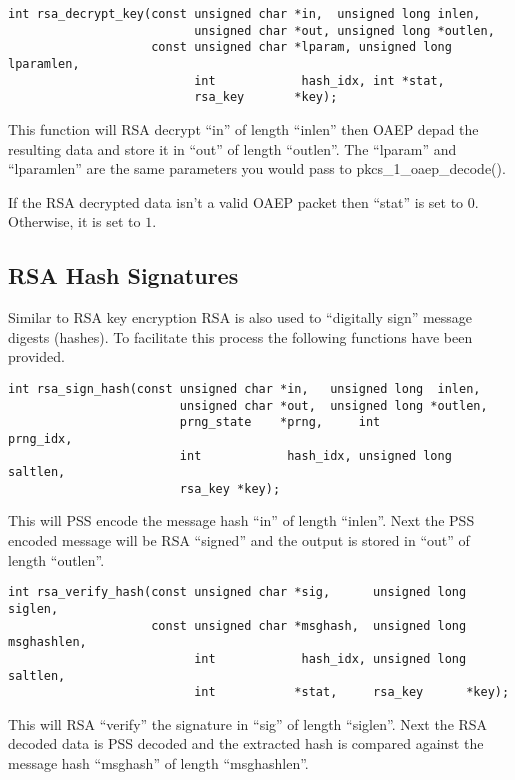\documentclass[a4paper]{book}
\begin{document}
\begin{verbatim}
int rsa_decrypt_key(const unsigned char *in,  unsigned long inlen,
                          unsigned char *out, unsigned long *outlen, 
                    const unsigned char *lparam, unsigned long lparamlen,
                          int            hash_idx, int *stat,
                          rsa_key       *key);
\end{verbatim}
This function will RSA decrypt ``in'' of length ``inlen'' then OAEP depad the resulting data and store it in
``out'' of length ``outlen''.  The ``lparam'' and ``lparamlen'' are the same parameters you would pass
to pkcs\_1\_oaep\_decode().

If the RSA decrypted data isn't a valid OAEP packet then ``stat'' is set to $0$.  Otherwise, it is set to $1$.

\subsection{RSA Hash Signatures}
Similar to RSA key encryption RSA is also used to ``digitally sign'' message digests (hashes).  To facilitate this
process the following functions have been provided.

\begin{verbatim}
int rsa_sign_hash(const unsigned char *in,   unsigned long  inlen, 
                        unsigned char *out,  unsigned long *outlen, 
                        prng_state    *prng,     int            prng_idx,
                        int            hash_idx, unsigned long  saltlen,
                        rsa_key *key);
\end{verbatim}

This will PSS encode the message hash ``in'' of length ``inlen''.  Next the PSS encoded message will be RSA ``signed'' and 
the output is stored in ``out'' of length ``outlen''.  


\begin{verbatim}
int rsa_verify_hash(const unsigned char *sig,      unsigned long siglen,
                    const unsigned char *msghash,  unsigned long msghashlen,
                          int            hash_idx, unsigned long saltlen,
                          int           *stat,     rsa_key      *key);
\end{verbatim}

This will RSA ``verify'' the signature in ``sig'' of length ``siglen''.  Next the RSA decoded data is PSS decoded
and the extracted hash is compared against the message hash ``msghash'' of length ``msghashlen''.
\end{document}
